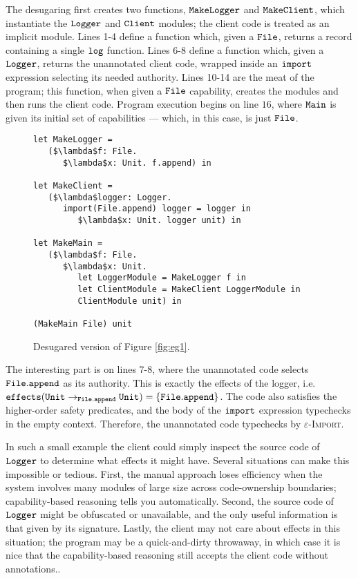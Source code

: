 The desugaring first creates two functions, $\mathtt{MakeLogger}$ and $\mathtt{MakeClient}$, which instantiate the $\mathtt{Logger}$ and $\mathtt{Client}$ modules; the client code is treated as an implicit module. Lines 1-4 define a function which, given a $\mathtt{File}$, returns a record containing a single $\mathtt{log}$ function. Lines 6-8 define a function which, given a $\mathtt{Logger}$, returns the unannotated client code, wrapped inside an $\mathtt{import}$ expression selecting its needed authority. Lines 10-14 are the meat of the program; this function, when given a $\mathtt{File}$ capability, creates the modules and then runs the client code. Program execution begins on line $16$, where $\mathtt{Main}$ is given its initial set of capabilities --- which, in this case, is just $\mathtt{File}$.

\begin{figure}[h]

\begin{lstlisting}
let MakeLogger =
   ($\lambda$f: File.
      $\lambda$x: Unit. f.append) in
          
let MakeClient =
   ($\lambda$logger: Logger.
      import(File.append) logger = logger in
         $\lambda$x: Unit. logger unit) in
          
let MakeMain =
   ($\lambda$f: File.
      $\lambda$x: Unit.
         let LoggerModule = MakeLogger f in
         let ClientModule = MakeClient LoggerModule in
         ClientModule unit) in

(MakeMain File) unit
\end{lstlisting}

\caption{Desugared version of Figure \ref{fig:eg1}.}
\label{fig:eg1_desugared}
\end{figure}

The interesting part  is on lines 7-8, where the unannotated code selects $\mathtt{File.append}$ as its authority. This is exactly the effects of the logger, i.e. $\mathtt{effects}(\mathtt{Unit} \rightarrow_{\mathtt{File.append}} \mathtt{Unit}) = \{ \mathtt{File.append} \}$. The code also satisfies the higher-order safety predicates, and the body of the $\mathtt{import}$ expression typechecks in the empty context. Therefore, the unannotated code typechecks by \textsc{$\varepsilon$-Import}.

In such a small example the client could simply inspect the source code of $\mathtt{Logger}$ to determine what effects it might have. Several situations can make this impossible or tedious. First, the manual approach loses efficiency when the system involves many modules of large size across code-ownership boundaries; capability-based reasoning tells you automatically. Second, the source code of $\mathtt{Logger}$ might be obfuscated or unavailable, and the only useful information is that given by its signature. Lastly, the client may not care about effects in this situation; the program may be a quick-and-dirty throwaway, in which case it is nice that the capability-based reasoning still accepts the client code without annotations..

